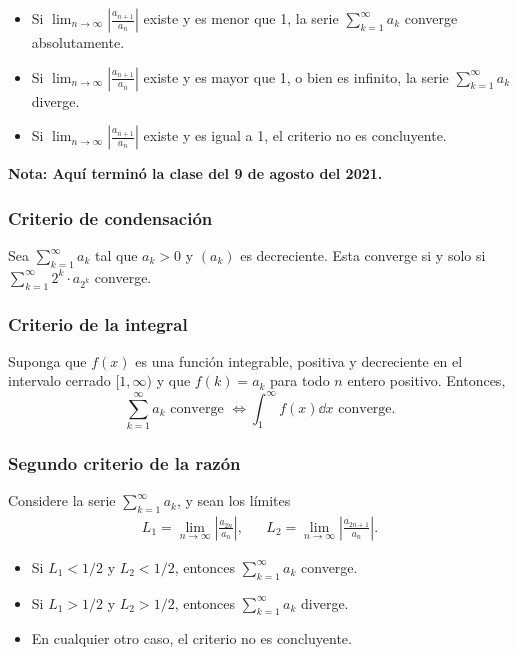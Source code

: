 \documentclass{article}
\begin{document}
\begin{itemize}

\item Si $\displaystyle\lim_{n\to\infty}\left|\frac{a_{n+1}}{a_n}\right|$ existe y es menor que 1, la serie $\displaystyle \sum_{k=1}^{\infty}a_k$ converge absolutamente.

\item Si $\displaystyle\lim_{n\to\infty}\left|\frac{a_{n+1}}{a_n}\right|$ existe y es mayor que 1, o bien es infinito, la serie $\displaystyle \sum_{k=1}^{\infty}a_k$ diverge.

\item Si $\displaystyle\lim_{n\to\infty}\left|\frac{a_{n+1}}{a_n}\right|$ existe y es igual a 1, el criterio no es concluyente.

\end{itemize}

\vspace{10pt}
\textbf{Nota: Aquí terminó la clase del 9 de agosto del 2021.}

\subsubsection*{Criterio de condensación}

Sea $\displaystyle \sum_{k=1}^{\infty}a_k$ tal que $a_k>0$ y $(a_k)$ es decreciente. Esta converge si y solo si $\displaystyle \sum_{k=1}^{\infty}2^k\cdot a_{2^k}$ converge.

\subsubsection*{Criterio de la integral}

Suponga que $f(x)$ es una función integrable, positiva y decreciente en el intervalo cerrado $[1,\infty)$ y que $f(k)=a_k$ para todo $n$ entero positivo. Entonces,
$$\displaystyle \sum_{k=1}^{\infty}a_k \text{ converge } \iff \displaystyle\int_1^{\infty}f(x)\dd{x} \text{ converge.}$$

\newpage
\subsubsection*{Segundo criterio de la razón}

Considere la serie $\displaystyle \sum_{k=1}^{\infty}a_k$, y sean los límites
\begin{align*}
L_1=\lim_{n\to\infty}\left|\frac{a_{2n}}{a_n}\right|, && L_2=\lim_{n\to\infty}\left|\frac{a_{2n+1}}{a_n}\right|.
\end{align*}
\begin{itemize}
\item Si $L_1<1/2$ y $L_2<1/2$, entonces $\displaystyle \sum_{k=1}^{\infty}a_k$ converge.

\item Si $L_1>1/2$ y $L_2>1/2$, entonces $\displaystyle \sum_{k=1}^{\infty}a_k$ diverge.

\item En cualquier otro caso, el criterio no es concluyente.

\end{itemize}
\end{document}
